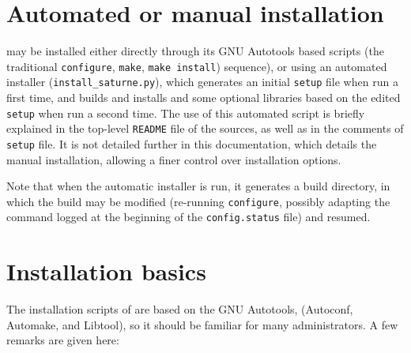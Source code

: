 \documentclass[a4paper,10pt,twoside]{csshortdoc}
\begin{document}
\def\contentsname{\textbf{\normalsize TABLE OF CONTENTS}\pdfbookmark[1]{Table of
contents}{contents}}

\renewcommand{\logocs}{cs_logo_wire_black}

\large
\makepdgCS
\normalsize

\passepage

\begin{center}\begin{singlespace}
\tableofcontents
\end{singlespace}\end{center}

\section{\CS Automated or manual installation\label{sec:inst_types}}

\CS may be installed either directly through its GNU Autotools based
scripts (the traditional \texttt{configure}, \texttt{make}, \texttt{make install})
sequence), or using an automated installer (\texttt{install\_saturne.py}),
which generates an initial \texttt{setup} file when run a first time,
and builds and installs \CS and some optional libraries based on the
edited \texttt{setup} when run a second time. The use of this automated script
is briefly explained in the top-level \texttt{README} file of the \CS
sources, as well as in the comments of \texttt{setup} file. It is not detailed
further in this documentation, which details the manual installation, allowing
a finer control over installation options.

Note that when the automatic installer is run, it generates a build directory,
in which the build may be modified (re-running \texttt{configure}, possibly
adapting the command logged at the beginning of the \texttt{config.status}
file) and resumed.

\section{Installation basics\label{sec:install_basics}}

The installation scripts of \CS are based on the GNU Autotools,
(Autoconf, Automake, and Libtool), so it should be familiar for many
administrators. A few remarks are given here:
\end{document}
